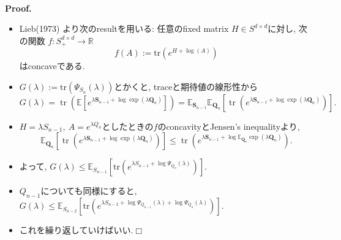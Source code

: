 \documentclass[unicode,aspectratio=169,11pt]{beamer}
\def\qed{\hfill $\Box$}
\newcommand{\ex}{\mathbb{E}}
\newcommand{\bb}{\mathbb}
\newcommand{\trace}{\mathrm{tr}}
\begin{document}
\begin{frame}{}{}
  　\\
{\bf Proof.}
\begin{itemize}
  \item Lieb(1973) より次のresultを用いる: 任意のfixed matrix $H \in S^{d\times d}$に対し, 次の関数 $f : S^{d\times d}_+ \to \bb{R}$
        \[ f(A) := \trace(e^{H + \log(A)}) \]
        はconcaveである.
  \item $G(\lambda) := \trace(\Psi_{S_n}(\lambda))$とかくと, traceと期待値の線形性から
        \[
          G(\lambda)
          =\operatorname{tr}\left(\mathbb{E}\left[e^{\lambda \mathbf{S}_{n-1}+\log \exp \left(\lambda \mathbf{Q}_{n}\right)}\right]\right)
          =\mathbb{E}_{\mathbf{S}_{n-1}} \mathbb{E}_{\mathbf{Q}_{n}}\left[\operatorname{tr}\left(e^{\lambda \mathbf{S}_{n-1}+\log \exp \left(\lambda \mathbf{Q}_{n}\right)}\right)
          \right].
        \]
  \item $H = \lambda S_{n-1},\ A = e^{\lambda Q_n}$としたときの$f$のconcavityとJensen's inequalityより,
        \[
          \mathbb{E}_{\mathbf{Q}_{n}}\left[\operatorname{tr}\left(e^{\lambda \mathbf{S}_{n-1}+\log \exp \left(\lambda \mathbf{Q}_{n}\right)}\right)\right] \leq \operatorname{tr}\left(e^{\lambda \mathbf{S}_{n-1}+\log \mathbb{E}_{\mathbf{Q}_{n}} \exp \left(\lambda \mathbf{Q}_{n}\right)}\right).
        \]
  \item よって, $G(\lambda) \le \ex_{S_{n-1}}[\trace (e^{\lambda S_{n-1} + \log \Psi_{Q_n}(\lambda)})]$.
  \item $Q_{n-1}$についても同様にすると, $G(\lambda) \le \ex_{S_{n-2}}[\trace (e^{\lambda S_{n-2} + \log \Psi_{Q_{n-1}}(\lambda) + \log \Psi_{Q_n}(\lambda)})]$.
  \item これを繰り返していけばいい.\qed
\end{itemize}
\end{frame}
\end{document}
